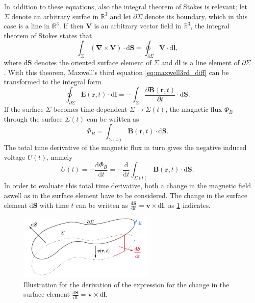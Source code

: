 \documentclass{report}
\numberwithin{tm}{section}
\newcommand\vect[1]{\ensuremath{\bm{#1}}}
\begin{document}
	In addition to these equations, also the integral theorem of Stokes is relevant; let $\Sigma$ denote an arbitrary surfae in $\mathbb{R}^3$ and let $\partial \Sigma$ denote its boundary, which in this case is a line in $\mathbb{R}^3$. If then $\vect{V}$ is an arbitrary vector field in $\mathbb{R}^3$, the integral theorem of Stokes states that \begin{equation}
		\int_{\Sigma} (\vect{\nabla} \times \vect{V})\cdot \mathrm{d}\vect{S} = \oint_{\partial \Sigma} \vect{V}\cdot \mathrm{d}\vect{l},
	\end{equation} where $\mathrm{d}\vect{S}$ denotes the oriented surface element of $\Sigma$ and $\mathrm{d}\vect{l}$ is a line element of $\partial \Sigma$. With this theorem, Maxwell's third equation \cref{eq:maxwell3rd_diff} can be transformed to the integral form \begin{equation}
	\label{eq:maxwell3rd_int}
	\oint_{\partial \Sigma} \vect{E}(\vect{r},t)\cdot \mathrm{d}\vect{l} = -\int_{\Sigma} \frac{\partial \vect{B}(\vect{r},t)}{\partial t}\cdot \mathrm{d}\vect{S}.
	\end{equation}
	If the surface $\Sigma$ becomes time-dependent $\Sigma \rightarrow \Sigma(t)$, the magnetic flux $\Phi_B$ through the surface $\Sigma(t)$ can be written as \begin{equation}
		\Phi_B = \int_{\Sigma(t)} \vect{B}(\vect{r},t)\cdot \mathrm{d}\vect{S}.
	\end{equation} The total time derivative of the magnetic flux in turn gives the negative induced voltage $U(t)$, namely \begin{equation}
	U(t) = -\frac{\mathrm{d}\Phi_B}{\mathrm{d}t} = -\frac{\mathrm{d}}{\mathrm{d}t} \int_{\Sigma(t)} \vect{B}(\vect{r},t)\cdot \mathrm{d}\vect{S}.
	\end{equation} In order to evaluate this total time derivative, both a change in the magnetic field aswell as in the surface element have to be considered. The change in the surface element $\mathrm{d}\vect{S}$ with time $t$ can be written as $\tfrac{\mathrm{d}\vect{S}}{\mathrm{d}t} = \vect{v} \times \mathrm{d}\vect{l}$, as \cref{fig:changeinsurfaceelement} indicates.
	\begin{figure}[h]
		\centering
		\includegraphics[width=0.6\textwidth]{figures/changeinsurfaceelement}
		\caption{Illustration for the derivation of the expression for the change in the surface element $\tfrac{\mathrm{d}\vect{S}}{\mathrm{d}t} = \vect{v} \times \mathrm{d}\vect{l}$.}
		\label{fig:changeinsurfaceelement}
	\end{figure}
\end{document}
